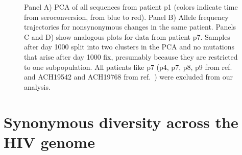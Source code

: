 \documentclass[rmp]{revtex4}
\begin{document}
\begin{figure}[ht]
\begin{center}
\caption{Panel A) PCA of all sequences from patient p1 (colors indicate time from seroconversion,
from blue to red). Panel B) Allele frequency trajectories for nonsynonymous
changes in the same patient. Panels C and D) show analogous plots for data from
patient p7. Samples after day 1000 split into two clusters in the PCA and no
mutations that arise after day 1000 fix, presumably because they are restricted
to one subpopulation. All patients like p7 (p4, p7, p8, p9 from ref.~\citealp{shankarappa_consistent_1999} and
ACH19542 and ACH19768 from ref.~\citealp{bunnik_autologous_2008}) were excluded
from our analysis.}
\label{fig:aftp}
\end{center}
\end{figure}

\section{Synonymous diversity across the HIV genome}
\end{document}
